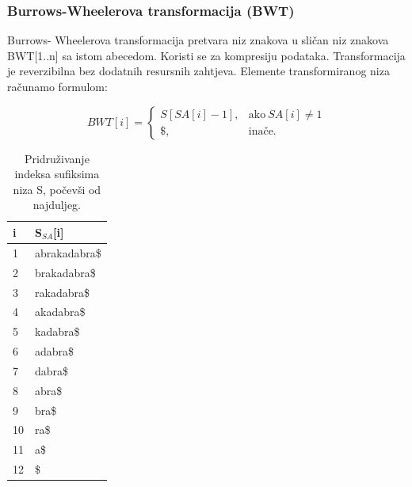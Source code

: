 \documentclass[a4paper,12pt]{article}
\begin{document}
\subsubsection{Burrows-Wheelerova transformacija (BWT)}
Burrows- Wheelerova transformacija pretvara niz znakova u sličan niz znakova BWT[1..n] sa istom abecedom. Koristi se za kompresiju podataka. Transformacija je reverzibilna bez dodatnih resursnih zahtjeva. Elemente transformiranog niza računamo formulom:

$$
BWT[i]=
\begin{cases}
S[SA[i]-1], & \text{ako} \  SA[i]\neq 1\\ 
\$, & \text{inače}.
\end{cases}
$$
 
\begin{table}[h!]
	\caption{Pridruživanje indeksa sufiksima niza S, počevši od najduljeg.}
	\label{tablePrimjer1}
	\begin{center}
		\begin{tabular}{ll}
			\toprule
			i & S$_{SA}$[i] \\
			\midrule
			1 & abrakadabra\$ \\
			2 & brakadabra\$ \\
			3 & rakadabra\$ \\
			4 & akadabra\$ \\
			5 & kadabra\$ \\
			6 & adabra\$ \\
			7 & dabra\$ \\
			8 & abra\$ \\
			9 & bra\$ \\
			10 & ra\$ \\
			11 & a\$ \\
			12 & \$ \\
			\bottomrule
		\end{tabular}
	\end{center}
\end{table}
\end{document}
